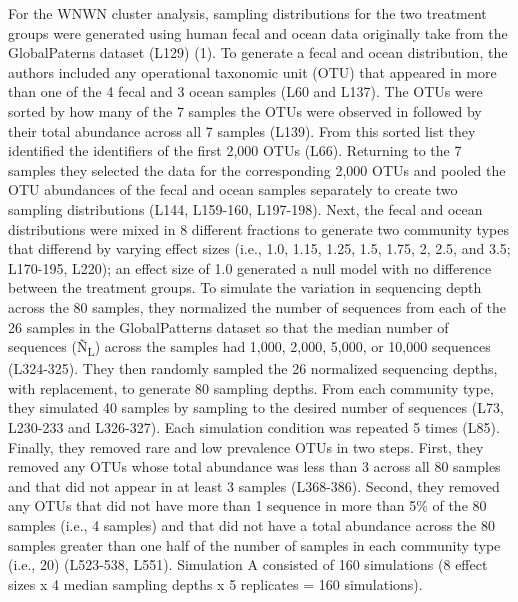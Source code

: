 \documentclass[
]{article}
\begin{document}
For the WNWN cluster analysis, sampling distributions for the two
treatment groups were generated using human fecal and ocean data
originally take from the GlobalPaterns dataset (L129) (1). To generate a
fecal and ocean distribution, the authors included any operational
taxonomic unit (OTU) that appeared in more than one of the 4 fecal and 3
ocean samples (L60 and L137). The OTUs were sorted by how many of the 7
samples the OTUs were observed in followed by their total abundance
across all 7 samples (L139). From this sorted list they identified the
identifiers of the first 2,000 OTUs (L66). Returning to the 7 samples
they selected the data for the corresponding 2,000 OTUs and pooled the
OTU abundances of the fecal and ocean samples separately to create two
sampling distributions (L144, L159-160, L197-198). Next, the fecal and
ocean distributions were mixed in 8 different fractions to generate two
community types that differend by varying effect sizes (i.e., 1.0, 1.15,
1.25, 1.5, 1.75, 2, 2.5, and 3.5; L170-195, L220); an effect size of 1.0
generated a null model with no difference between the treatment groups.
To simulate the variation in sequencing depth across the 80 samples,
they normalized the number of sequences from each of the 26 samples in
the GlobalPatterns dataset so that the median number of sequences
(Ñ\textsubscript{L}) across the samples had 1,000, 2,000, 5,000, or
10,000 sequences (L324-325). They then randomly sampled the 26
normalized sequencing depths, with replacement, to generate 80 sampling
depths. From each community type, they simulated 40 samples by sampling
to the desired number of sequences (L73, L230-233 and L326-327). Each
simulation condition was repeated 5 times (L85). Finally, they removed
rare and low prevalence OTUs in two steps. First, they removed any OTUs
whose total abundance was less than 3 across all 80 samples and that did
not appear in at least 3 samples (L368-386). Second, they removed any
OTUs that did not have more than 1 sequence in more than 5\% of the 80
samples (i.e., 4 samples) and that did not have a total abundance across
the 80 samples greater than one half of the number of samples in each
community type (i.e., 20) (L523-538, L551). Simulation A consisted of
160 simulations (8 effect sizes x 4 median sampling depths x 5
replicates = 160 simulations).
\end{document}
